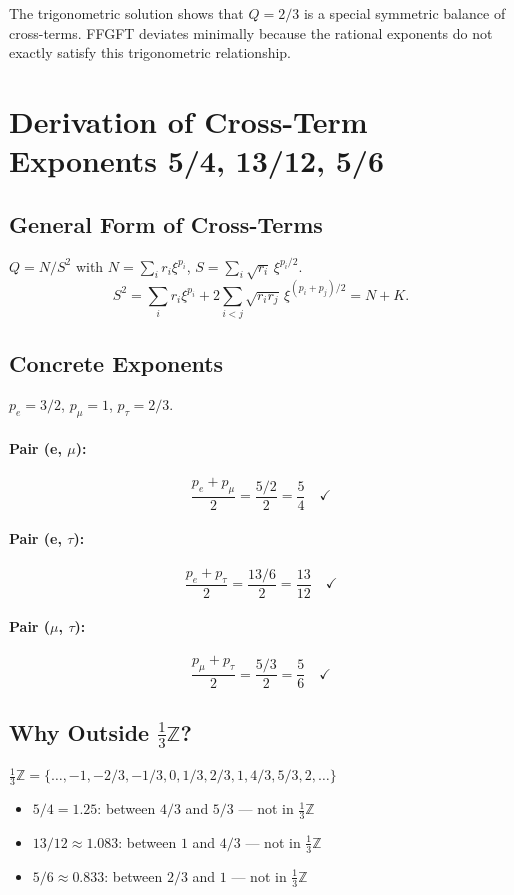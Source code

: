 The trigonometric solution shows that $Q=2/3$ is a special symmetric balance
of cross-terms. FFGFT deviates minimally because the rational exponents do not
exactly satisfy this trigonometric relationship.

\section{Derivation of Cross-Term Exponents 5/4, 13/12, 5/6}


\subsection{General Form of Cross-Terms}

$Q=N/S^2$ with $N=\sum_ir_i\xi^{p_i}$, $S=\sum_i\sqrt{r_i}\,\xi^{p_i/2}$.
\[
  S^2 = \sum_ir_i\xi^{p_i}+2\sum_{i<j}\sqrt{r_ir_j}\,\xi^{(p_i+p_j)/2} = N+K.
\]

\subsection{Concrete Exponents}

$p_e=3/2$, $p_\mu=1$, $p_\tau=2/3$.

\paragraph{Pair (e, $\mu$):}
\[
  \frac{p_e+p_\mu}{2} = \frac{5/2}{2} = \boxed{\frac{5}{4}} \quad\checkmark
\]

\paragraph{Pair (e, $\tau$):}
\[
  \frac{p_e+p_\tau}{2} = \frac{13/6}{2} = \boxed{\frac{13}{12}} \quad\checkmark
\]

\paragraph{Pair ($\mu$, $\tau$):}
\[
  \frac{p_\mu+p_\tau}{2} = \frac{5/3}{2} = \boxed{\frac{5}{6}} \quad\checkmark
\]

\subsection{Why Outside $\tfrac{1}{3}\mathbb{Z}$?}

$\tfrac{1}{3}\mathbb{Z}=\{\ldots,-1,-2/3,-1/3,0,1/3,2/3,1,4/3,5/3,2,\ldots\}$
\begin{itemize}
  \item $5/4=1.25$: between $4/3$ and $5/3$ --- not in $\tfrac{1}{3}\mathbb{Z}$
  \item $13/12\approx1.083$: between $1$ and $4/3$ --- not in $\tfrac{1}{3}\mathbb{Z}$
  \item $5/6\approx0.833$: between $2/3$ and $1$ --- not in $\tfrac{1}{3}\mathbb{Z}$
\end{itemize}

